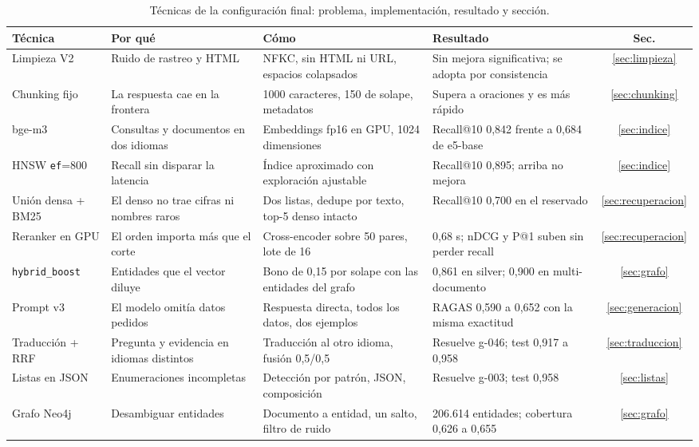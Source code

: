 \begin{table}[t]
\centering
\scriptsize
\setlength{\tabcolsep}{4pt}
\caption{T\'ecnicas de la configuraci\'on final: problema, implementaci\'on, resultado y secci\'on.}
\label{tab:tecnicas}
\begin{tabular}{@{}p{2.3cm}p{3.9cm}p{4.8cm}p{4.4cm}c@{}}
\toprule
T\'ecnica & Por qu\'e & C\'omo & Resultado & Sec. \\
\midrule
Limpieza V2 & Ruido de rastreo y HTML & NFKC, sin HTML ni URL, espacios colapsados & Sin mejora significativa; se adopta por consistencia & \ref{sec:limpieza} \\
Chunking fijo & La respuesta cae en la frontera & 1000 caracteres, 150 de solape, metadatos & Supera a oraciones y es m\'as r\'apido & \ref{sec:chunking} \\
bge-m3 & Consultas y documentos en dos idiomas & Embeddings fp16 en GPU, 1024 dimensiones & Recall@10 0,842 frente a 0,684 de e5-base & \ref{sec:indice} \\
HNSW \texttt{ef}=800 & Recall sin disparar la latencia & \'Indice aproximado con exploraci\'on ajustable & Recall@10 0,895; arriba no mejora & \ref{sec:indice} \\
Uni\'on densa + BM25 & El denso no trae cifras ni nombres raros & Dos listas, dedupe por texto, top-5 denso intacto & Recall@10 0,700 en el reservado & \ref{sec:recuperacion} \\
Reranker en GPU & El orden importa m\'as que el corte & Cross-encoder sobre 50 pares, lote de 16 & 0,68 s; nDCG y P@1 suben sin perder recall & \ref{sec:recuperacion} \\
\texttt{hybrid\_boost} & Entidades que el vector diluye & Bono de 0,15 por solape con las entidades del grafo & 0,861 en silver; 0,900 en multi-documento & \ref{sec:grafo} \\
Prompt v3 & El modelo omit\'ia datos pedidos & Respuesta directa, todos los datos, dos ejemplos & RAGAS 0,590 a 0,652 con la misma exactitud & \ref{sec:generacion} \\
Traducci\'on + RRF & Pregunta y evidencia en idiomas distintos & Traducci\'on al otro idioma, fusi\'on 0,5/0,5 & Resuelve g-046; test 0,917 a 0,958 & \ref{sec:traduccion} \\
Listas en JSON & Enumeraciones incompletas & Detecci\'on por patr\'on, JSON, composici\'on & Resuelve g-003; test 0,958 & \ref{sec:listas} \\
Grafo Neo4j & Desambiguar entidades & Documento a entidad, un salto, filtro de ruido & 206.614 entidades; cobertura 0,626 a 0,655 & \ref{sec:grafo} \\

\end{tabular}
\end{table}

